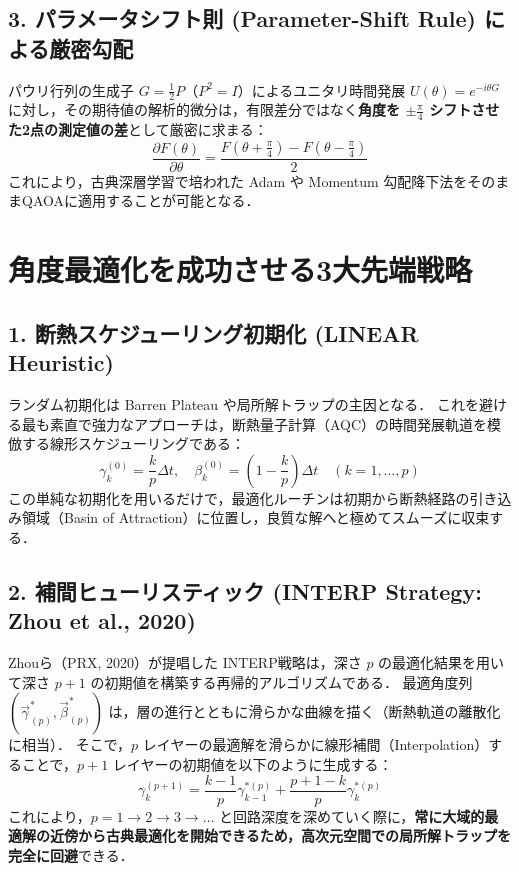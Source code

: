 \documentclass[11pt,a4paper,oneside,openany]{ltjsbook}
\theoremstyle{definition}
\theoremstyle{plain}
\theoremstyle{remark}
\begin{document}
\subsection{3. パラメータシフト則 (Parameter-Shift Rule) による厳密勾配 \cite{mitarai2018quantum,schuld2019evaluating}}
パウリ行列の生成子 $G = \frac{1}{2} P$（$P^2 = I$）によるユニタリ時間発展 $U(\theta) = e^{-i \theta G}$ に対し，その期待値の解析的微分は，有限差分ではなく\textbf{角度を $\pm \frac{\pi}{4}$ シフトさせた2点の測定値の差}として厳密に求まる：
\begin{equation}
    \frac{\partial F(\theta)}{\partial \theta} = \frac{F\left(\theta + \frac{\pi}{4}\right) - F\left(\theta - \frac{\pi}{4}\right)}{2}
\end{equation}
これにより，古典深層学習で培われた Adam や Momentum 勾配降下法をそのままQAOAに適用することが可能となる．

\section{角度最適化を成功させる3大先端戦略}

\subsection{1. 断熱スケジューリング初期化 (LINEAR Heuristic)}
ランダム初期化は Barren Plateau や局所解トラップの主因となる．
これを避ける最も素直で強力なアプローチは，断熱量子計算（AQC）の時間発展軌道を模倣する線形スケジューリングである：
\begin{equation}
    \gamma_k^{(0)} = \frac{k}{p} \Delta t, \quad \beta_k^{(0)} = \left(1 - \frac{k}{p}\right) \Delta t \quad (k = 1, \dots, p)
\end{equation}
この単純な初期化を用いるだけで，最適化ルーチンは初期から断熱経路の引き込み領域（Basin of Attraction）に位置し，良質な解へと極めてスムーズに収束する．

\subsection{2. 補間ヒューリスティック (INTERP Strategy: Zhou et al., 2020) \cite{zhou2020quantum}}
Zhouら（PRX, 2020）が提唱した INTERP戦略は，深さ $p$ の最適化結果を用いて深さ $p+1$ の初期値を構築する再帰的アルゴリズムである．
最適角度列 $(\vec{\gamma}^*_{(p)}, \vec{\beta}^*_{(p)})$ は，層の進行とともに滑らかな曲線を描く（断熱軌道の離散化に相当）．
そこで，$p$ レイヤーの最適解を滑らかに線形補間（Interpolation）することで，$p+1$ レイヤーの初期値を以下のように生成する：
\begin{equation}
    \gamma_{k}^{(p+1)} = \frac{k-1}{p} \gamma_{k-1}^{*(p)} + \frac{p+1-k}{p} \gamma_{k}^{*(p)}
\end{equation}
これにより，$p=1 \to 2 \to 3 \to \dots$ と回路深度を深めていく際に，\textbf{常に大域的最適解の近傍から古典最適化を開始できるため，高次元空間での局所解トラップを完全に回避}できる．
\end{document}

